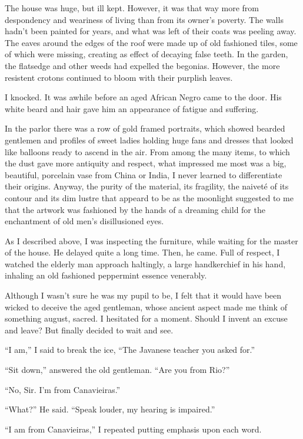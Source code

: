 \documentclass[a4paper,12pt]{book}
\begin{document}
The house was huge, but ill kept.
However, it was that way more from
despondency and weariness of living
than from its owner's poverty.
The walls hadn't been
painted for years, and what was left
of their coats was peeling away.
The eaves around the edges of the
roof were made up of old fashioned tiles,
some of which were missing, creating
as effect of decaying false teeth.
In the garden, the
flatsedge and other weeds had expelled the 
begonias. However, the more resistent crotons
continued to bloom with their purplish leaves.

I knocked. It was awhile before 
an aged African Negro came to the door. His white
beard and hair gave him an appearance of
fatigue and suffering.

In the parlor there was a row of gold framed portraits,
which showed bearded gentlemen and profiles of
sweet ladies holding huge fans and dresses
that looked like balloons ready to ascend in the air.
From among the many items,
to which the dust gave more antiquity and respect,
what impressed me most was a big, beautiful,
porcelain vase from China or India, I never
learned to differentiate their origins.
Anyway, the purity of the material,
its fragility, the naiveté of its contour
and its dim lustre that appeard to be
as the moonlight suggested to me that
the artwork was fashioned by the hands
of a dreaming child for
the enchantment of old men's  disillusioned eyes.

As I described above, I was inspecting the furniture,
while waiting for the master of the house.
He delayed quite a long time. Then, he came.
Full of respect, I watched the elderly man
approach haltingly,
a large handkerchief in his
hand, inhaling an old fashioned peppermint
essence venerably.

Although I wasn't sure he was my pupil to be, I felt
that it would have been wicked to deceive the
aged gentleman, whose ancient aspect made
me think of something august, sacred.
I hesitated for a moment. Should I invent
an excuse and leave? But finally
decided to wait and see.

``I am,'' I said to break the ice,
``The Javanese teacher you asked for.''

``Sit down,'' answered the old gentleman.
``Are you from Rio?''

``No, Sir. I'm from Canavieiras.''

``What?'' He said. ``Speak louder, my hearing is impaired.''

``I am from Canavieiras,'' I repeated putting emphasis
upon each word.
\end{document}
